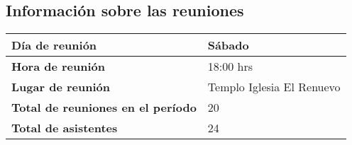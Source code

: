 \documentclass[12pt,letterpaper]{article}
\begin{document}
\subsection{Información sobre las reuniones}
\begin{table}[!h]
\centering
\begin{tabular}{|l|l|}
\hline
\textbf{Día de reunión} & Sábado \\ \hline
\textbf{Hora de reunión} & 18:00 hrs \\ \hline
\textbf{Lugar de reunión} & Templo Iglesia El Renuevo \\ \hline
\textbf{Total de reuniones en el período} & 20 \\ \hline
\textbf{Total de asistentes} & 24 \\ \hline
\end{tabular}
\end{table}
\end{document}
